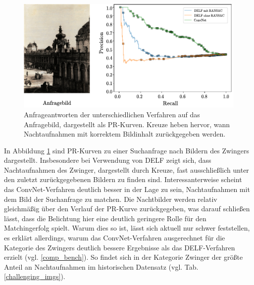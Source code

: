 \begin{figure}[h]
\centering
\includegraphics[scale=1.0]{night_pr}
\caption{Anfrageantworten der unterschiedlichen Verfahren auf das Anfragebild, dargestellt als PR-Kurven. Kreuze heben hervor, wann Nachtaufnahmen mit korrektem Bildinhalt zurückgegeben werden.}
\label{night_pr}
\end{figure}
In Abbildung \ref{night_pr} sind PR-Kurven zu einer Suchanfrage nach Bildern des Zwingers dargestellt. Insbesondere bei Verwendung von DELF zeigt sich, dass Nachtaufnahmen des Zwinger, dargestellt durch Kreuze, fast ausschließlich unter den zuletzt zurückgegebenen Bildern zu finden sind. Interessanterweise scheint das ConvNet-Verfahren deutlich besser in der Lage zu sein, Nachtaufnahmen mit dem Bild der Suchanfrage zu matchen. Die Nachtbilder werden relativ gleichmäßig über den Verlauf der PR-Kurve zurückgegeben, was darauf schließen lässt, dass die Belichtung hier eine deutlich geringere Rolle für den Matchingerfolg spielt. Warum dies so ist, lässt sich aktuell nur schwer feststellen, es erklärt allerdings, warum das ConvNet-Verfahren ausgerechnet für die Kategorie des Zwingers deutlich bessere Ergebnisse als das DELF-Verfahren erzielt (vgl. \ref{comp_bench}). So findet sich in der Kategorie Zwinger der größte Anteil an Nachtaufnahmen im historischen Datensatz (vgl. Tab. \ref{challenging_imgs}).
\begin{table}[h]
\caption{Anteil an Objektdarstellungen im historischen Datensatz, die unterschiedliche erschwerende Besonderheiten vorweisen.}
\label{challenging_imgs}
\end{table}
